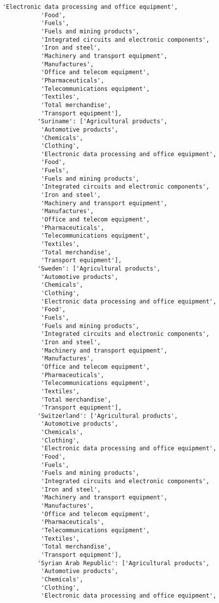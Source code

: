 \documentclass[11pt]{article}
\begin{document}
\begin{Verbatim}[commandchars=\\\{\}]
           'Electronic data processing and office equipment',
           'Food',
           'Fuels',
           'Fuels and mining products',
           'Integrated circuits and electronic components',
           'Iron and steel',
           'Machinery and transport equipment',
           'Manufactures',
           'Office and telecom equipment',
           'Pharmaceuticals',
           'Telecommunications equipment',
           'Textiles',
           'Total merchandise',
           'Transport equipment'],
          'Suriname': ['Agricultural products',
           'Automotive products',
           'Chemicals',
           'Clothing',
           'Electronic data processing and office equipment',
           'Food',
           'Fuels',
           'Fuels and mining products',
           'Integrated circuits and electronic components',
           'Iron and steel',
           'Machinery and transport equipment',
           'Manufactures',
           'Office and telecom equipment',
           'Pharmaceuticals',
           'Telecommunications equipment',
           'Textiles',
           'Total merchandise',
           'Transport equipment'],
          'Sweden': ['Agricultural products',
           'Automotive products',
           'Chemicals',
           'Clothing',
           'Electronic data processing and office equipment',
           'Food',
           'Fuels',
           'Fuels and mining products',
           'Integrated circuits and electronic components',
           'Iron and steel',
           'Machinery and transport equipment',
           'Manufactures',
           'Office and telecom equipment',
           'Pharmaceuticals',
           'Telecommunications equipment',
           'Textiles',
           'Total merchandise',
           'Transport equipment'],
          'Switzerland': ['Agricultural products',
           'Automotive products',
           'Chemicals',
           'Clothing',
           'Electronic data processing and office equipment',
           'Food',
           'Fuels',
           'Fuels and mining products',
           'Integrated circuits and electronic components',
           'Iron and steel',
           'Machinery and transport equipment',
           'Manufactures',
           'Office and telecom equipment',
           'Pharmaceuticals',
           'Telecommunications equipment',
           'Textiles',
           'Total merchandise',
           'Transport equipment'],
          'Syrian Arab Republic': ['Agricultural products',
           'Automotive products',
           'Chemicals',
           'Clothing',
           'Electronic data processing and office equipment',

\end{Verbatim}
\end{document}
